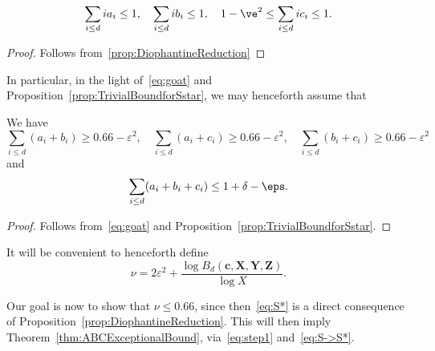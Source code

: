 \begin{lemma}\label{lem:aibiciconstraints}
  \leanok
  \begin{equation}\label{eq:oat1}
  \sum_{i\leq d} ia_i \leq 1, \quad \sum_{i\leq d} ib_i \leq 1, \quad 1-\ve^2\leq \sum_{i\leq d} ic_i \leq 1.
  \end{equation}
\end{lemma}
\begin{proof}
  Follows from~\ref{prop:DiophantineReduction}
\end{proof}

In particular, in the light of~\eqref{eq:goat} and Proposition~\ref{prop:TrivialBoundforSstar}, we may henceforth assume that
\begin{lemma}\label{lem:Trivialaibici}
  \leanok
  We have
  \begin{equation}\label{eq:oat4}
  \sum_{i\leq d} (a_i+b_i)\geq 0.66-\varepsilon^2,\quad \sum_{i\leq d} (a_i+c_i)\geq 0.66-\varepsilon^2,\quad
  \sum_{i\leq d} (b_i+c_i) \geq 0.66-\varepsilon^2
  \end{equation} and
  \begin{equation}\label{eq:oat3}
  \sum_{i\leq d} (a_i+b_i+c_i) \leq 1+\delta-\eps.
  \end{equation}
\end{lemma}
\begin{proof}
  Follows from~\eqref{eq:goat} and Proposition~\ref{prop:TrivialBoundforSstar}.
\end{proof}

\begin{definition}\label{def:nu}
  It will be convenient to henceforth define
  \begin{equation*}
    \nu=2\varepsilon^2+\frac{\log B_d(\mathbf{c},\mathbf{X},\mathbf{Y},\mathbf{Z})}{\log X}.
  \end{equation*}
\end{definition}

Our goal is now to show that $\nu\le 0.66$, since then~\eqref{eq:S*}
is a direct consequence of
Proposition~\ref{prop:DiophantineReduction}.
This will then imply
Theorem~\ref{thm:ABCExceptionalBound}, via~\eqref{eq:step1} and~\eqref{eq:S->S*}.

